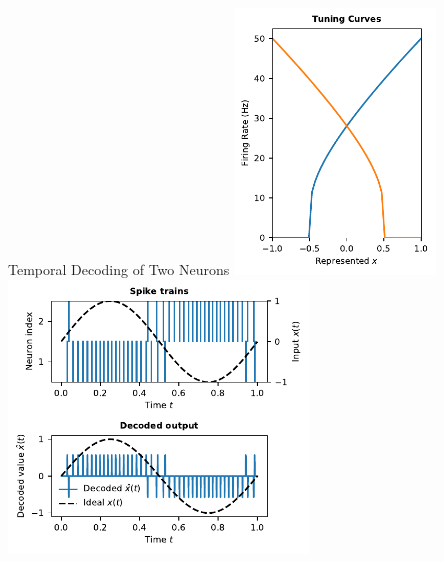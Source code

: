 \documentclass[handout,aspectratio=169]{beamer}
\begin{document}
\begin{frame}{Temporal Decoding of Two Neurons}
	\includegraphics[width=0.4\textwidth]{media/two_neurons_tuning_curves.pdf}%
	\includegraphics[width=0.6\textwidth]{media/two_neurons_spike_train.pdf}
\end{frame}
\end{document}
